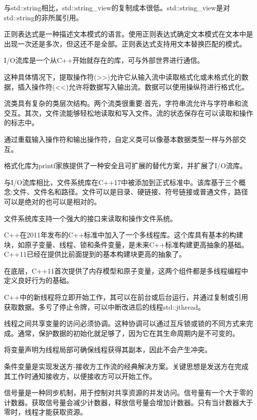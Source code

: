 与std::string相比，std::string\_view的复制成本很低。std::string\_view是对std::string的非所属引用。

正则表达式是一种描述文本模式的语言。使用正则表达式确定文本模式在文本中是出现一次还是多次，但这还不是全部。正则表达式支持用文本替换匹配的模式。


I/O流库是一个从C++开始就存在的库，可与外部世界进行通信。

这种具体情况下，提取操作符(>{}>)允许它从输入流中读取格式化或未格式化的数据，插入操作符(<{}<)允许将数据写入输出流。数据可以使用操纵符进行格式化。

流类具有复杂的类层次结构。两个流类很重要:首先，字符串流允许与字符串和流交互。其次，文件流能够轻松地读取和写入文件。流的状态保存在可以读取和操作的标志中。

通过重载输入操作符和输出操作符，自定义类可以像基本数据类型一样与外部交互。

格式化库为printf家族提供了一种安全且可扩展的替代方案，并扩展了I/O流库。

与I/O流库相比，文件系统库在C++17中被添加到正式标准中。该库基于三个概念:文件、文件名和路径。文件可以是目录、硬链接、符号链接或普通文件，路径可以是绝对的也可以是相对的。

文件系统库支持一个强大的接口来读取和操作文件系统。


C++在2011年发布的C++标准中加入了一个多线程库。这个库具有基本的构建块，如原子变量、线程、锁和条件变量，是未来C++标准构建更高抽象的基础。C++11已经在提供比前面提到的基本构建块更高的抽象了。

在底层，C++11首次提供了内存模型和原子变量，这两个组件都是多线程编程中定义良好行为的基础。

C++中的新线程将立即开始工作，其可以在前台或后台运行，并通过复制或引用获取数据。多亏了停止令牌，可以中断改进后的线程std::jthread。

线程之间共享变量的访问必须协调。这种协调可以通过互斥锁或锁的不同方式来完成。通常，保护数据的初始化就足够了，因为它在其生命周期内是不可变的。

将变量声明为线程局部可确保线程获得其副本，因此不会产生冲突。

条件变量是实现发送方-接收方工作流的经典解决方案。关键思想是发送方在完成其工作时通知接收方，以便接收方可以开始工作。

信号量是一种同步机制，用于控制对共享资源的并发访问。信号量有一个大于零的计数器。获取信号量会减少计数器，释放信号量会增加计数器。只有当计数器大于零时，线程才能获取资源。

